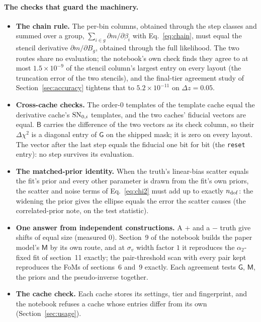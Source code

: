 \documentclass[11pt]{article}
\newcommand{\SNzi}{{\rm SN}_{0,i}}
\newcommand{\mB}{\mathsf{B}}
\newcommand{\mM}{\mathsf{M}}
\newcommand{\mG}{\mathsf{G}}
\begin{document}
\paragraph{The checks that guard the machinery.}
\begin{itemize}
  \item \textbf{The chain rule.}  The per-bin columns, obtained through
    the step classes and summed over a group,
    $\sum_{i \in g} \partial m/\partial \beta_i$ with
    Eq.~\eqref{eq:chain}, must equal the stencil derivative
    $\partial m/\partial B_g$, obtained through the full likelihood.
    The two routes share no evaluation; the notebook's own check finds
    they agree to at most
    $1.5\times10^{-9}$ of the stencil column's largest entry on every
    layout (the truncation error of the two stencils), and the
    final-tier
    agreement study of Section~\ref{sec:accuracy} tightens that to
    $5.2\times10^{-11}$ on $\Delta z = 0.05$.
  \item \textbf{Cross-cache checks.}  The order-0 templates of the
    template cache equal the derivative cache's $\SNzi$ templates, and
    the two caches' fiducial vectors are equal.  $\mB$
    carries the difference of the two vectors as its check column, so
    their $\Delta\chi^2$ is a diagonal entry of $\mG$ on the shipped
    mask; it is zero on every layout.  The vector after the last step
    equals the fiducial one bit for bit (the \texttt{reset} entry): no
    step survives its evaluation.
  \item \textbf{The matched-prior identity.}  When the truth's
    linear-bias
    scatter equals the fit's prior and every other parameter is drawn
    from the fit's own priors, the scatter and noise terms of
    Eq.~\eqref{eq:chi2} must add up to exactly $n_{\rm dof}$: the
    widening the prior gives the ellipse equals the error the scatter
    causes (the correlated-prior note, on the test statistic).
  \item \textbf{One answer from independent constructions.}  A $+$ and
    a $-$ truth give shifts of equal size (measured $0$).  Section~9 of
    the notebook builds the paper model's $\mM$ by its own route, and
    at $\sigma_v$ width factor $1$ it reproduces the
    $\alpha_2$-fixed fit of section~11 exactly; the pair-threshold scan
    with every pair kept reproduces the FoMs of sections~6 and~9
    exactly.  Each agreement tests $\mG$, $\mM$, the priors and the
    pseudo-inverse together.
  \item \textbf{The cache check.}  Each cache stores its settings, tier
    and fingerprint, and the notebook refuses a cache whose entries
    differ from its own (Section~\ref{sec:usage}).
\end{itemize}
\end{document}
